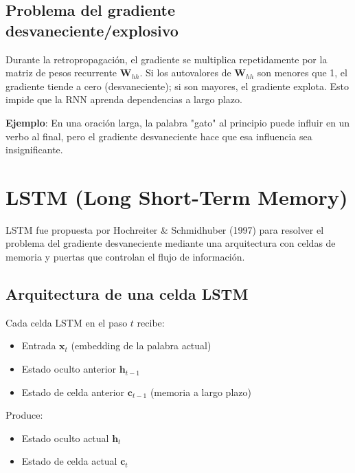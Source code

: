 \documentclass[12pt,a4paper,openany,oneside]{book}
\begin{document}
\subsection{Problema del gradiente desvaneciente/explosivo}
Durante la retropropagación, el gradiente se multiplica repetidamente por la matriz de pesos recurrente \(\mathbf{W}_{hh}\). Si los autovalores de \(\mathbf{W}_{hh}\) son menores que 1, el gradiente tiende a cero (desvaneciente); si son mayores, el gradiente explota. Esto impide que la RNN aprenda dependencias a largo plazo.

\textbf{Ejemplo}: En una oración larga, la palabra "gato" al principio puede influir en un verbo al final, pero el gradiente desvaneciente hace que esa influencia sea insignificante.

\section{LSTM (Long Short-Term Memory)}

LSTM fue propuesta por Hochreiter \& Schmidhuber (1997) para resolver el problema del gradiente desvaneciente mediante una arquitectura con celdas de memoria y puertas que controlan el flujo de información.

\subsection{Arquitectura de una celda LSTM}
Cada celda LSTM en el paso \(t\) recibe:
\begin{itemize}
    \item Entrada \(\mathbf{x}_t\) (embedding de la palabra actual)
    \item Estado oculto anterior \(\mathbf{h}_{t-1}\)
    \item Estado de celda anterior \(\mathbf{c}_{t-1}\) (memoria a largo plazo)
\end{itemize}
Produce:
\begin{itemize}
    \item Estado oculto actual \(\mathbf{h}_t\)
    \item Estado de celda actual \(\mathbf{c}_t\)
\end{itemize}

\begin{center}
\caption{Entradas y salidas de una celda LSTM.}
\end{center}
\end{document}
